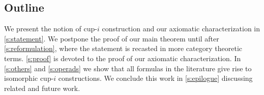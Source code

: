 %

\subsection*{Outline}

We present the notion of cup-$i$ construction and our axiomatic characterization in \cref{s:statement}.
We postpone the proof of our main theorem until after \cref{s:reformulation}, where the statement is recasted in more category theoretic terms.
\cref{s:proof} is devoted to the proof of our axiomatic characterization.
In \cref{s:others} and \cref{s:operads} we show that all formulas in the literature give rise to isomorphic \mbox{cup-$i$} constructions.
We conclude this work in \cref{s:epilogue} discussing related and future work.

